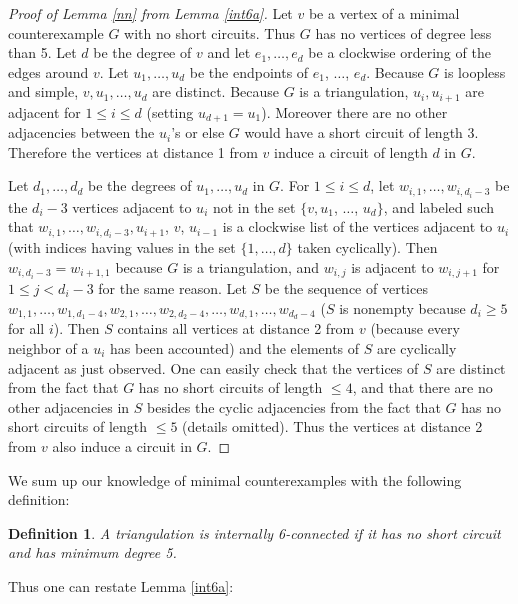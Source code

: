 \documentclass[11pt]{article}
\newtheorem{definition}[theorem]{Definition}
\begin{document}
\begin{proof}[Proof of Lemma \ref{nn} from Lemma \ref{int6a}]
Let $v$ be a vertex of a minimal counterexample $G$ with no short circuits. Thus $G$ has no vertices of degree less than 5. 
Let $d$ be the degree of $v$ and let 
$e_1, \ldots, e_d$ be a clockwise ordering of the edges around $v$. Let $u_1, \ldots, u_d$ be the endpoints of $e_1$, $\ldots$, $e_d$. Because $G$ is loopless and simple, $v, u_1, \ldots, u_d$ are distinct. Because $G$ is a triangulation, $u_i, u_{i+1}$ are adjacent for $1 \leq i \leq d$ (setting $u_{d+1} = u_1$).
Moreover there are no other adjacencies between the $u_i$'s or else $G$ would have a short circuit of length 3. Therefore the vertices at distance 1 from $v$ induce a circuit of length $d$ in $G$.

Let $d_1, \ldots, d_d$ be the degrees of $u_1, \ldots, u_d$ in $G$. For $1 \leq i \leq d$, let $w_{i,1}, \ldots, w_{i,d_i-3}$ be the $d_i - 3$ vertices adjacent to $u_i$ not in the set $\{v, u_1$, $\ldots$, $u_d\}$, and labeled such that $w_{i,1}, \ldots, w_{i,d_i-3}, u_{i+1}$, $v$, $u_{i-1}$ is a clockwise list of the vertices adjacent to $u_i$ (with indices having values in the set $\{1, \ldots, d\}$ taken cyclically).
Then $w_{i,d_i-3} = w_{i+1,1}$ because $G$ is a triangulation, and $w_{i,j}$ is adjacent to $w_{i,j+1}$ for $1 \leq j < d_i - 3$ for the same reason. 
Let $S$ be the sequence of vertices $w_{1,1}, \ldots, w_{1,d_1-4}, w_{2,1}, \ldots, w_{2,d_2-4}, \ldots, w_{d,1}, \dots, w_{d_d-4}$ ($S$ is nonempty because $d_i \geq 5$ for all $i$). Then $S$ contains all vertices at distance 2 from $v$ (because every neighbor of a $u_i$ has been accounted) and the elements of $S$ are cyclically adjacent as just observed.
One can easily check that the vertices of $S$ are distinct from the fact that $G$ has no short circuits of length $\leq 4$, and that there are no other adjacencies in $S$ besides the cyclic adjacencies from the fact that $G$ has no short circuits of length $\leq 5$ (details omitted). Thus the vertices at distance 2 from $v$ also induce a circuit in $G$.
\end{proof}

\noindent We sum up our knowledge of minimal counterexamples with the following definition:

\begin{definition}
A triangulation is \emph{internally 6-connected} if it has no short circuit and has minimum degree 5.
\end{definition}

\noindent Thus one can restate Lemma \ref{int6a}:
\end{document}
